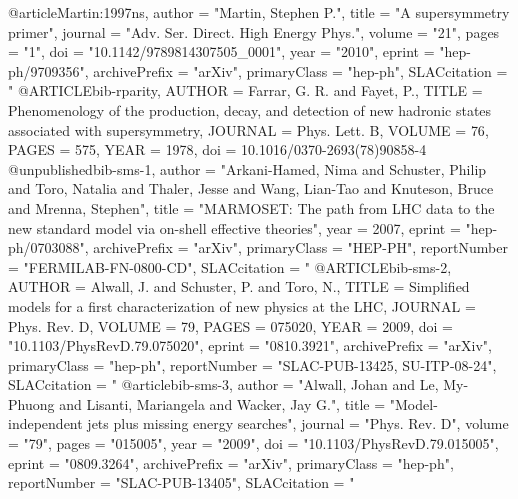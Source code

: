@article{Martin:1997ns,
      author         = "Martin, Stephen P.",
      title          = "{A supersymmetry primer}",
      journal        = "Adv. Ser. Direct. High Energy Phys.",
      volume         = "21",
      pages          = "1",
      doi            = "10.1142/9789814307505_0001",
      year           = "2010",
      eprint         = "hep-ph/9709356",
      archivePrefix  = "arXiv",
      primaryClass   = "hep-ph",
      SLACcitation   = "%
}
@ARTICLE{bib-rparity,
  AUTHOR         = {Farrar, G. R. and Fayet, P.},
  TITLE          = {Phenomenology of the production, decay, and detection of
                    new hadronic states associated with supersymmetry},
  JOURNAL        = {Phys. Lett. B},
  VOLUME         = {76},
  PAGES          = {575},
  YEAR           = {1978},
  doi            = {10.1016/0370-2693(78)90858-4}
}
@unpublished{bib-sms-1,
  author         = "Arkani-Hamed, Nima and Schuster, Philip and Toro, Natalia
                    and Thaler, Jesse and Wang, Lian-Tao and Knuteson, Bruce
                   and Mrenna, Stephen",
  title         = "{{MARMOSET}: The path from {LHC} data to the new standard model
                     via on-shell effective theories}",
  year          = {2007},
      eprint         = "hep-ph/0703088",
      archivePrefix  = "arXiv",
      primaryClass   = "HEP-PH",
      reportNumber   = "FERMILAB-FN-0800-CD",
  SLACcitation  = "%
}
@ARTICLE{bib-sms-2,
  AUTHOR         = {Alwall, J. and Schuster, P. and Toro, N.},
  TITLE          = {Simplified models for a first characterization of new physics
                    at the {LHC}},
  JOURNAL        = {Phys. Rev. D},
  VOLUME         = {79},
  PAGES          = {075020},
  YEAR           = {2009},
  doi            =  "10.1103/PhysRevD.79.075020",
      eprint         = "0810.3921",
      archivePrefix  = "arXiv",
      primaryClass   = "hep-ph",
      reportNumber   = "SLAC-PUB-13425, SU-ITP-08-24",
      SLACcitation   = "%
}
@article{bib-sms-3,
  author         = "Alwall, Johan and Le, My-Phuong and Lisanti, Mariangela
                    and Wacker, Jay G.",
  title          = "{Model-independent jets plus missing energy searches}",
  journal        = "Phys. Rev. D",
  volume         = "79",
  pages          = "015005",
  year           = "2009",
  doi            = "10.1103/PhysRevD.79.015005",
      eprint         = "0809.3264",
      archivePrefix  = "arXiv",
      primaryClass   = "hep-ph",
      reportNumber   = "SLAC-PUB-13405",
      SLACcitation   = "%
}
